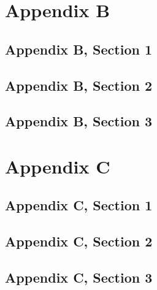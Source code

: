 \documentclass[a4paper,11pt,oneside]{memoir}
\numberwithin{algorithm}{chapter}
\begin{document}
\chapter{Appendix B}
\lipsum[1]
\section{Appendix B, Section 1}
\lipsum[2-3]
\section{Appendix B, Section 2}
\lipsum[4-5]
\section{Appendix B, Section 3}
\lipsum[6-7]

\chapter{Appendix C}
\lipsum[1]
\section{Appendix C, Section 1}
\lipsum[2-3]
\section{Appendix C, Section 2}
\lipsum[4-5]
\section{Appendix C, Section 3}
\lipsum[6-7]

\cleardoublepage




\backmatter


{}


\printnomenclature

\printindex

\cleardoublepage

\thispagestyle{empty}
\begin{center}
\end{center}
\end{document}
